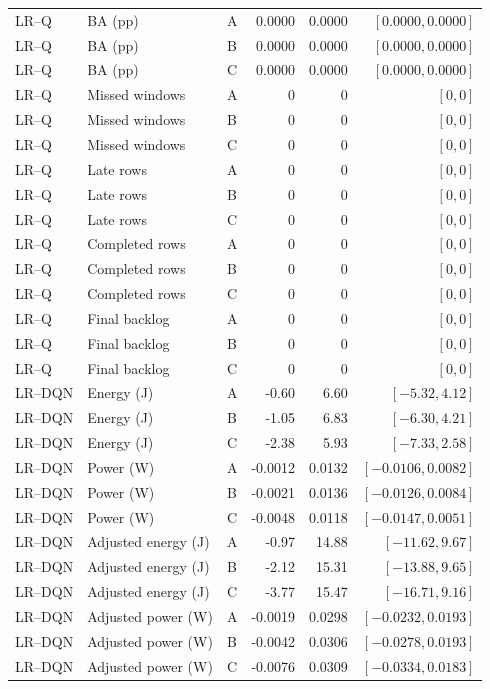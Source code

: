 \begin{longtable}{lllrrr}
LR--Q & BA (pp) & A & 0.0000 & 0.0000 & $[0.0000,0.0000]$\\
LR--Q & BA (pp) & B & 0.0000 & 0.0000 & $[0.0000,0.0000]$\\
LR--Q & BA (pp) & C & 0.0000 & 0.0000 & $[0.0000,0.0000]$\\
LR--Q & Missed windows & A & 0 & 0 & $[0,0]$\\
LR--Q & Missed windows & B & 0 & 0 & $[0,0]$\\
LR--Q & Missed windows & C & 0 & 0 & $[0,0]$\\
LR--Q & Late rows & A & 0 & 0 & $[0,0]$\\
LR--Q & Late rows & B & 0 & 0 & $[0,0]$\\
LR--Q & Late rows & C & 0 & 0 & $[0,0]$\\
LR--Q & Completed rows & A & 0 & 0 & $[0,0]$\\
LR--Q & Completed rows & B & 0 & 0 & $[0,0]$\\
LR--Q & Completed rows & C & 0 & 0 & $[0,0]$\\
LR--Q & Final backlog & A & 0 & 0 & $[0,0]$\\
LR--Q & Final backlog & B & 0 & 0 & $[0,0]$\\
LR--Q & Final backlog & C & 0 & 0 & $[0,0]$\\
LR--DQN & Energy (J) & A & -0.60 & 6.60 & $[-5.32,4.12]$\\
LR--DQN & Energy (J) & B & -1.05 & 6.83 & $[-6.30,4.21]$\\
LR--DQN & Energy (J) & C & -2.38 & 5.93 & $[-7.33,2.58]$\\
LR--DQN & Power (W) & A & -0.0012 & 0.0132 & $[-0.0106,0.0082]$\\
LR--DQN & Power (W) & B & -0.0021 & 0.0136 & $[-0.0126,0.0084]$\\
LR--DQN & Power (W) & C & -0.0048 & 0.0118 & $[-0.0147,0.0051]$\\
LR--DQN & Adjusted energy (J) & A & -0.97 & 14.88 & $[-11.62,9.67]$\\
LR--DQN & Adjusted energy (J) & B & -2.12 & 15.31 & $[-13.88,9.65]$\\
LR--DQN & Adjusted energy (J) & C & -3.77 & 15.47 & $[-16.71,9.16]$\\
LR--DQN & Adjusted power (W) & A & -0.0019 & 0.0298 & $[-0.0232,0.0193]$\\
LR--DQN & Adjusted power (W) & B & -0.0042 & 0.0306 & $[-0.0278,0.0193]$\\
LR--DQN & Adjusted power (W) & C & -0.0076 & 0.0309 & $[-0.0334,0.0183]$\\

\end{longtable}
